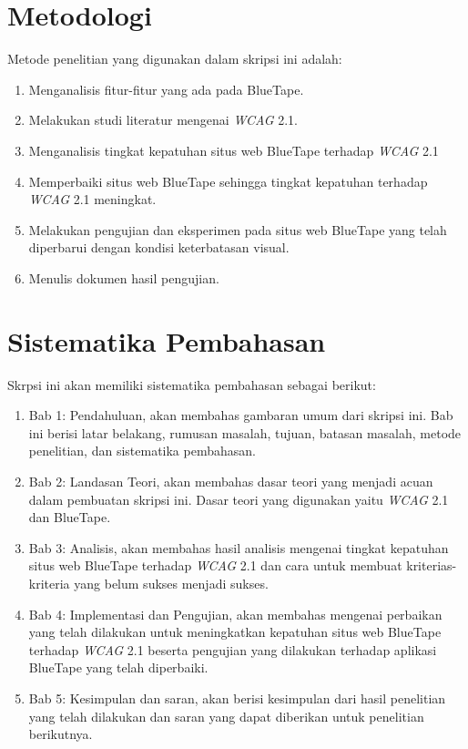 \section{Metodologi}
\label{sec:metlit}
Metode penelitian yang digunakan dalam skripsi ini adalah:
\begin{enumerate}
	\item Menganalisis fitur-fitur yang ada pada BlueTape.
	\item Melakukan studi literatur mengenai \textit{WCAG} 2.1.
	\item Menganalisis tingkat kepatuhan situs web BlueTape terhadap \textit{WCAG} 2.1
	\item Memperbaiki situs web BlueTape sehingga tingkat kepatuhan terhadap \textit{WCAG} 2.1 meningkat.
	\item Melakukan pengujian dan eksperimen pada situs web BlueTape yang telah diperbarui dengan kondisi keterbatasan visual.
	\item Menulis dokumen hasil pengujian.
\end{enumerate}

\section{Sistematika Pembahasan}
\label{sec:sispem}
Skrpsi ini akan memiliki sistematika pembahasan sebagai berikut: 
\begin{enumerate}
	\item Bab 1: Pendahuluan, akan membahas gambaran umum dari skripsi ini. Bab ini berisi latar belakang, rumusan masalah, tujuan, batasan masalah, metode penelitian, dan sistematika pembahasan.
	\item Bab 2: Landasan Teori, akan membahas dasar teori yang menjadi acuan dalam pembuatan skripsi ini. Dasar teori yang digunakan yaitu \textit{WCAG} 2.1 dan BlueTape.
	\item Bab 3: Analisis, akan membahas hasil analisis mengenai tingkat kepatuhan situs web BlueTape terhadap \textit{WCAG} 2.1 dan cara untuk membuat kriterias-kriteria yang belum sukses menjadi sukses.
	\item Bab 4: Implementasi dan Pengujian, akan membahas mengenai perbaikan yang telah dilakukan untuk meningkatkan kepatuhan situs web BlueTape terhadap \textit{WCAG} 2.1 beserta pengujian yang dilakukan terhadap aplikasi BlueTape yang telah diperbaiki.
	\item Bab 5: Kesimpulan dan saran, akan berisi kesimpulan dari hasil penelitian yang telah dilakukan dan saran yang dapat diberikan untuk penelitian berikutnya.
\end{enumerate}